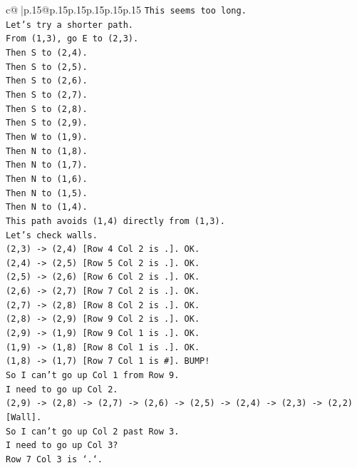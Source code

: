 \documentclass{article}
\begin{document}
{\begin{supertabular}{c@{$\;$}|p{.15\linewidth}@{}p{.15\linewidth}p{.15\linewidth}p{.15\linewidth}p{.15\linewidth}p{.15\linewidth}}
{{{\texttt{This seems too long.} \\
\texttt{Let's try a shorter path.} \\
\texttt{From (1,3), go E to (2,3).} \\
\texttt{Then S to (2,4).} \\
\texttt{Then S to (2,5).} \\
\texttt{Then S to (2,6).} \\
\texttt{Then S to (2,7).} \\
\texttt{Then S to (2,8).} \\
\texttt{Then S to (2,9).} \\
\texttt{Then W to (1,9).} \\
\texttt{Then N to (1,8).} \\
\texttt{Then N to (1,7).} \\
\texttt{Then N to (1,6).} \\
\texttt{Then N to (1,5).} \\
\texttt{Then N to (1,4).} \\
\texttt{This path avoids (1,4) directly from (1,3).} \\
\texttt{Let's check walls.} \\
\texttt{(2,3) {-}> (2,4) {[}Row 4 Col 2 is .{]}. OK.} \\
\texttt{(2,4) {-}> (2,5) {[}Row 5 Col 2 is .{]}. OK.} \\
\texttt{(2,5) {-}> (2,6) {[}Row 6 Col 2 is .{]}. OK.} \\
\texttt{(2,6) {-}> (2,7) {[}Row 7 Col 2 is .{]}. OK.} \\
\texttt{(2,7) {-}> (2,8) {[}Row 8 Col 2 is .{]}. OK.} \\
\texttt{(2,8) {-}> (2,9) {[}Row 9 Col 2 is .{]}. OK.} \\
\texttt{(2,9) {-}> (1,9) {[}Row 9 Col 1 is .{]}. OK.} \\
\texttt{(1,9) {-}> (1,8) {[}Row 8 Col 1 is .{]}. OK.} \\
\texttt{(1,8) {-}> (1,7) {[}Row 7 Col 1 is \#{]}. BUMP!} \\
\texttt{So I can't go up Col 1 from Row 9.} \\
\texttt{I need to go up Col 2.} \\
\texttt{(2,9) {-}> (2,8) {-}> (2,7) {-}> (2,6) {-}> (2,5) {-}> (2,4) {-}> (2,3) {-}> (2,2) {[}Wall{]}.} \\
\texttt{So I can't go up Col 2 past Row 3.} \\
\texttt{I need to go up Col 3?} \\
\texttt{Row 7 Col 3 is `.`.} \\
}}}
\end{supertabular}}
\end{document}
